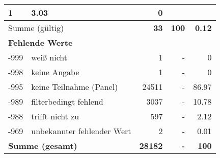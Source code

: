 \begin{longtable}{lXrrr}
       \num{1} &
       \num[round-mode=places,round-precision=2]{3.03} &
         \num[round-mode=places,round-precision=2]{0} \\
     \midrule
     \multicolumn{2}{l}{Summe (gültig)} &
       \textbf{\num{33}} &
     \textbf{\num{100}} &
       \textbf{\num[round-mode=places,round-precision=2]{0.12}} \\
     \multicolumn{5}{l}{\textbf{Fehlende Werte}}\\
       -999 &
       weiß nicht &
         \num{1} &
        - &
         \num[round-mode=places,round-precision=2]{0} \\
       -998 &
       keine Angabe &
         \num{1} &
        - &
         \num[round-mode=places,round-precision=2]{0} \\
       -995 &
       keine Teilnahme (Panel) &
         \num{24511} &
        - &
         \num[round-mode=places,round-precision=2]{86.97} \\
       -989 &
       filterbedingt fehlend &
         \num{3037} &
        - &
         \num[round-mode=places,round-precision=2]{10.78} \\
       -988 &
       trifft nicht zu &
         \num{597} &
        - &
         \num[round-mode=places,round-precision=2]{2.12} \\
       -969 &
       unbekannter fehlender Wert &
         \num{2} &
        - &
         \num[round-mode=places,round-precision=2]{0.01} \\
     \midrule
     \multicolumn{2}{l}{\textbf{Summe (gesamt)}} &
          \textbf{\num{28182}} &
        \textbf{-} &
        \textbf{\num{100}} \\
     \bottomrule
     \end{longtable}
     

